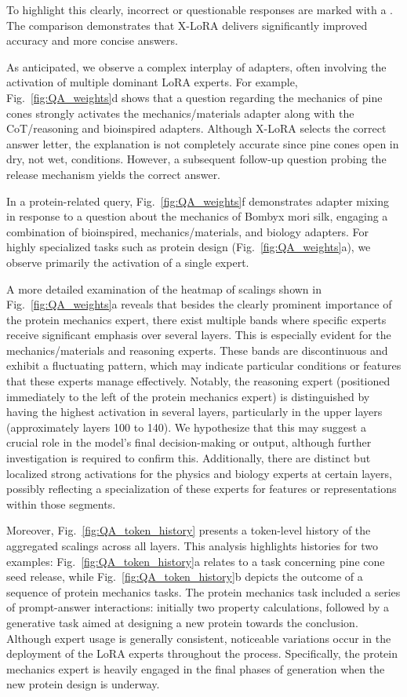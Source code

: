 To highlight this clearly, incorrect or questionable responses are marked with a . The comparison demonstrates that X-LoRA delivers significantly improved accuracy and more concise answers. 

As anticipated, we observe a complex interplay of adapters, often involving the activation of multiple dominant LoRA experts. For example, Fig.~\ref{fig:QA_weights}d shows that a question regarding the mechanics of pine cones strongly activates the mechanics/materials adapter along with the CoT/reasoning and bioinspired adapters. Although X-LoRA selects the correct answer letter, the explanation is not completely accurate since pine cones open in dry, not wet, conditions. However, a subsequent follow-up question probing the release mechanism yields the correct answer. 

In a protein-related query, Fig.~\ref{fig:QA_weights}f demonstrates adapter mixing in response to a question about the mechanics of Bombyx mori silk, engaging a combination of bioinspired, mechanics/materials, and biology adapters. For highly specialized tasks such as protein design (Fig.~\ref{fig:QA_weights}a), we observe primarily the activation of a single expert.

A more detailed examination of the heatmap of scalings shown in Fig.~\ref{fig:QA_weights}a reveals that besides the clearly prominent importance of the protein mechanics expert, there exist multiple bands where specific experts receive significant emphasis over several layers. This is especially evident for the mechanics/materials and reasoning experts. These bands are discontinuous and exhibit a fluctuating pattern, which may indicate particular conditions or features that these experts manage effectively. Notably, the reasoning expert (positioned immediately to the left of the protein mechanics expert) is distinguished by having the highest activation in several layers, particularly in the upper layers (approximately layers 100 to 140). We hypothesize that this may suggest a crucial role in the model's final decision-making or output, although further investigation is required to confirm this. Additionally, there are distinct but localized strong activations for the physics and biology experts at certain layers, possibly reflecting a specialization of these experts for features or representations within those segments.

Moreover, Fig.~\ref{fig:QA_token_history} presents a token-level history of the aggregated scalings across all layers. This analysis highlights histories for two examples: Fig.~\ref{fig:QA_token_history}a relates to a task concerning pine cone seed release, while Fig.~\ref{fig:QA_token_history}b depicts the outcome of a sequence of protein mechanics tasks. The protein mechanics task included a series of prompt-answer interactions: initially two property calculations, followed by a generative task aimed at designing a new protein towards the conclusion. Although expert usage is generally consistent, noticeable variations occur in the deployment of the LoRA experts throughout the process. Specifically, the protein mechanics expert is heavily engaged in the final phases of generation when the new protein design is underway.

